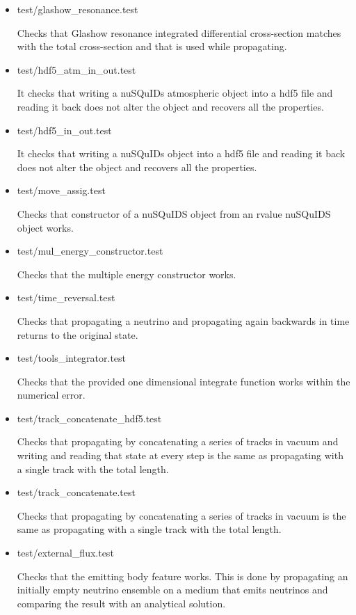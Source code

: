 \documentclass[3p,12pt]{elsarticle}
\newcommand{\ttf}{\ttfamily}
\begin{document}
\begin{itemize}
\item {\ttf test/glashow\_resonance.test}
  
  Checks that Glashow resonance integrated differential cross-section
  matches with the total cross-section and that is used while propagating. 
  
\item {\ttf test/hdf5\_atm\_in\_out.test}
  
  It checks that writing a nuSQuIDs atmospheric object into a hdf5 file and reading it
  back does not alter the object and recovers all the properties.

  
\item {\ttf test/hdf5\_in\_out.test}
  
  It checks that writing a nuSQuIDs object into a hdf5 file and reading it
  back does not alter the object and recovers all the properties.

\item {\ttf test/move\_assig.test}
  
  Checks that constructor of a nuSQuIDS object from an rvalue nuSQuIDS object works.
  
\item {\ttf test/mul\_energy\_constructor.test}
  
  Checks that the multiple energy constructor works.
  
\item {\ttf test/time\_reversal.test}
  
  Checks that propagating a neutrino and propagating again backwards
  in time returns to the original state.
  
\item {\ttf test/tools\_integrator.test}
  
  Checks that the provided one dimensional integrate function works
  within the numerical error.
  
\item {\ttf test/track\_concatenate\_hdf5.test}
  
  Checks that propagating by concatenating a series of tracks in
  vacuum and writing and reading that state at every step is the same
  as propagating with a single track with the total length. 
  
  
\item {\ttf test/track\_concatenate.test}
  
  Checks that propagating by concatenating a series of tracks in
  vacuum is the same as propagating with a single track with the total length. 
  
\item {\ttf test/external\_flux.test}
  
  Checks that the emitting body feature works. This is done by propagating 
  an initially empty neutrino ensemble on a medium that emits neutrinos and comparing the 
  result with an analytical solution.

\end{itemize}

\end{document}

